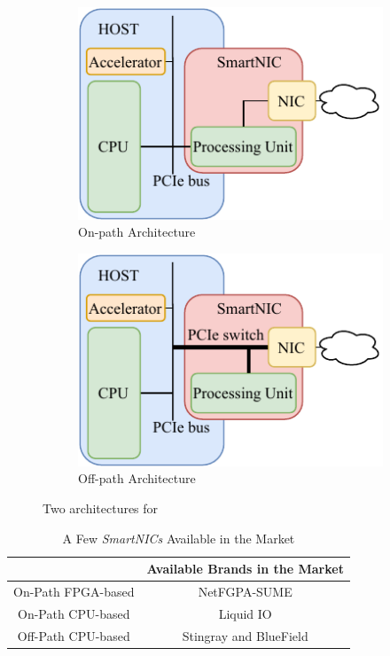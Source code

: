 \begin{figure}[ht!]
\centering
    \begin{subfigure}{0.23\textwidth}
        \includegraphics[width=\textwidth]{./figs/on-path.pdf}
        \caption{On-path Architecture}
        \label{on-path}
    \end{subfigure}\hfil
    \begin{subfigure}{0.23\textwidth}
        \includegraphics[width=\textwidth]{./figs/off-path.pdf}
        \caption{Off-path Architecture}
        \label{off-path}
    \end{subfigure}\hfil
    \caption{Two architectures for \smartnics}
\label{arhs}
\end{figure}

\begin{table}[hbt!]
\caption{A Few \textit{SmartNICs} Available in the Market}
\label{brands}
\begin{tabular}{|c|c|}
\hline
                   & Available Brands in the Market \\ \hline
On-Path FPGA-based & NetFGPA-SUME \cite{netfpga-sume}                  \\ \hline
On-Path CPU-based  & Liquid IO \cite{liquidio}                     \\ \hline
Off-Path CPU-based & Stingray \cite{stingray} and BlueField \cite{bluefield}        \\ \hline
\end{tabular}
\end{table}

